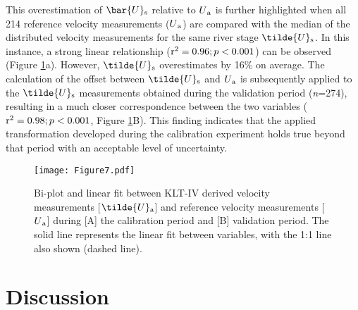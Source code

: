 \documentclass[hess, manuscript]{copernicus}
\begin{document}
This overestimation of $\bar{U}\textsubscript{s}$ relative to $U\textsubscript{a}$ is further highlighted when all 214 reference velocity measurements ($U\textsubscript{a}$) are compared with the median of the distributed velocity measurements for the same river stage $\tilde{U}\textsubscript{s}$. In this instance, a strong linear relationship ($\textnormal{r\textsuperscript{2}} = 0.96; p < 0.001$) can be observed (Figure \ref{Figure7}a). However, $\tilde{U}\textsubscript{s}$ overestimates by 16\% on average. The calculation of the offset between $\tilde{U}\textsubscript{s}$ and $U\textsubscript{a}$ is subsequently applied to the $\tilde{U}\textsubscript{s}$ measurements obtained during the validation period (\textit{n}=274), resulting in a much closer correspondence between the two variables ($\textnormal{r\textsuperscript{2}} = 0.98; p < 0.001$, Figure \ref{Figure7}B). This finding indicates that the applied transformation developed during the calibration experiment holds true beyond that period with an acceptable level of uncertainty.

\begin{figure}[!htb]
\centering 
\texttt{[image: Figure7.pdf]}
\caption{Bi-plot and linear fit between KLT-IV derived velocity measurements [$\tilde{U}\textsubscript{a}$] and reference velocity measurements [$U\textsubscript{a}$] during [A] the calibration period and [B] validation period. The solid line represents the linear fit between variables, with the 1:1 line also shown (dashed line).}
\label{Figure7} 
\end{figure}



\section{Discussion}
\end{document}
